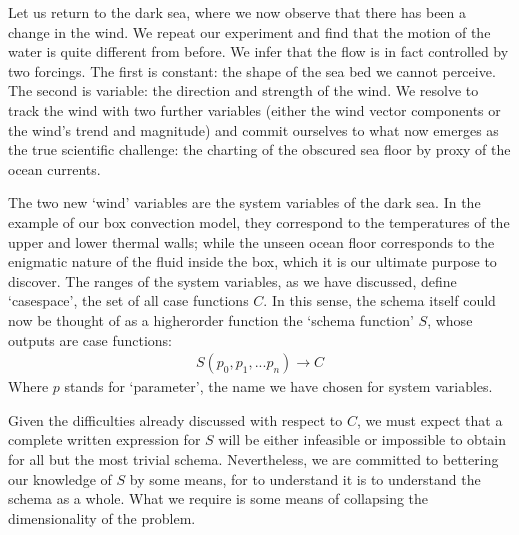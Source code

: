 \documentclass[letterpaper,10pt,english]{jupyterBook}
\begin{document}
\sphinxAtStartPar
Let us return to the dark sea, where we now observe that there has been a change in the wind. We repeat our experiment and find that the motion of the water is quite different from before. We infer that the flow is in fact controlled by two forcings. The first is constant: the shape of the sea bed we cannot perceive. The second is variable: the direction and strength of the wind. We resolve to track the wind with two further variables (either the wind vector components or the wind’s trend and magnitude) and commit ourselves to what now emerges as the true scientific challenge: the charting of the obscured sea floor by proxy of the ocean currents.

\sphinxAtStartPar
The two new ‘wind’ variables are the system variables of the dark sea. In the example of our box convection model, they correspond to the temperatures of the upper and lower thermal walls; while the unseen ocean floor corresponds to the enigmatic nature of the fluid inside the box, which it is our ultimate purpose to discover. The ranges of the system variables, as we have discussed, define ‘case\sphinxhyphen{}space’, the set of all case functions \(C\). In this sense, the schema itself could now be thought of as a higher\sphinxhyphen{}order function \sphinxhyphen{} the ‘schema function’ \(S\), whose outputs are case functions:
\begin{equation*}
\begin{split} S \left( p_0, p_1, ... p_n \right) \to C \end{split}
\end{equation*}
\sphinxAtStartPar
Where \(p\) stands for ‘parameter’, the name we have chosen for system variables.

\sphinxAtStartPar
Given the difficulties already discussed with respect to \(C\), we must expect that a complete written expression for \(S\) will be either infeasible or impossible to obtain for all but the most trivial schema. Nevertheless, we are committed to bettering our knowledge of \(S\) by some means, for to understand it is to understand the schema as a whole. What we require is some means of collapsing the dimensionality of the problem.
\end{document}

